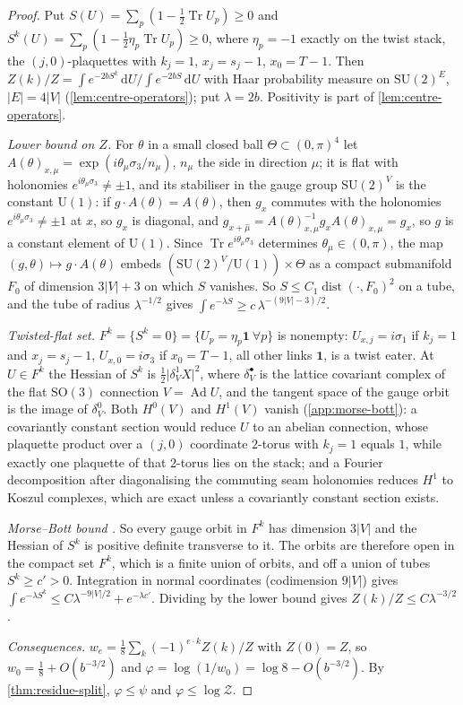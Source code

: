 \documentclass[11pt,a4paper]{amsart}
\theoremstyle{definition}
\theoremstyle{remark}
\numberwithin{equation}{section}
\DeclareMathOperator{\Tr}{Tr}        %
\newcommand{\abs}[1]{\lvert #1\rvert}      %
\newcommand{\dd}{\,\mathrm{d}}             %
\newcommand{\SU}{\mathrm{SU}}              %
\newcommand{\U}{\mathrm{U}}                %
\newcommand{\TT}{\mathbb{T}}               %
\newcommand{\Zc}{\mathcal{Z}}              %
\begin{document}
\begin{proof}
Put $S(U)=\sum_p(1-\frac12\Tr U_p)\ge0$ and $S^k(U)=\sum_p(1-\frac12\eta_p\Tr U_p)\ge0$, where $\eta_p=-1$ exactly on the twist stack, the $(j,0)$-plaquettes with $k_j=1$, $x_j=s_j-1$, $x_0=T-1$. Then $Z(k)/Z=\int e^{-2bS^k}\dd U/\int e^{-2bS}\dd U$ with Haar probability measure on $\SU(2)^E$, $\abs E=4\abs V$ \textup{(}\cref{lem:centre-operators}\textup{)}; put $\lambda=2b$. Positivity is part of \cref{lem:centre-operators}.

\emph{Lower bound on $Z$.} For $\theta$ in a small closed ball $\Theta\subset(0,\pi)^4$ let $A(\theta)_{x,\mu}=\exp(i\theta_\mu\sigma_3/n_\mu)$, $n_\mu$ the side in direction $\mu$; it is flat with holonomies $e^{i\theta_\mu\sigma_3}\ne\pm1$, and its stabiliser in the gauge group $\SU(2)^V$ is the constant $\U(1)$: if $g\cdot A(\theta)=A(\theta)$, then $g_x$ commutes with the holonomies $e^{i\theta_\mu\sigma_3}\ne\pm1$ at $x$, so $g_x$ is diagonal, and $g_{x+\hat\mu}=A(\theta)_{x,\mu}^{-1}g_xA(\theta)_{x,\mu}=g_x$, so $g$ is a constant element of $\U(1)$. Since $\Tr e^{i\theta_\mu\sigma_3}$ determines $\theta_\mu\in(0,\pi)$, the map $(g,\theta)\mapsto g\cdot A(\theta)$ embeds $(\SU(2)^V/\U(1))\times\Theta$ as a compact submanifold $F_0$ of dimension $3\abs V+3$ on which $S$ vanishes. So $S\le C_1\operatorname{dist}(\cdot,F_0)^2$ on a tube, and the tube of radius $\lambda^{-1/2}$ gives $\int e^{-\lambda S}\ge c\,\lambda^{-(9\abs V-3)/2}$.

\emph{Twisted-flat set.} $F^k=\{S^k=0\}=\{U_p=\eta_p\mathbf1\ \forall p\}$ is nonempty: $U_{x,j}=i\sigma_1$ if $k_j=1$ and $x_j=s_j-1$, $U_{x,0}=i\sigma_3$ if $x_0=T-1$, all other links $\mathbf1$, is a twist eater. At $U\in F^k$ the Hessian of $S^k$ is $\frac12\abs{\delta^1_VX}^2$, where $\delta^\bullet_V$ is the lattice covariant complex of the flat $\mathrm{SO}(3)$ connection $V=\operatorname{Ad}U$, and the tangent space of the gauge orbit is the image of $\delta^0_V$. Both $H^0(V)$ and $H^1(V)$ vanish (\cref{app:morse-bott}): a covariantly constant section would reduce $U$ to an abelian connection, whose plaquette product over a $(j,0)$ coordinate $2$-torus with $k_j=1$ equals $1$, while exactly one plaquette of that $2$-torus lies on the stack; and a Fourier decomposition after diagonalising the commuting seam holonomies reduces $H^1$ to Koszul complexes, which are exact unless a covariantly constant section exists.

\emph{Morse--Bott bound \cite{bott1954}.} So every gauge orbit in $F^k$ has dimension $3\abs V$ and the Hessian of $S^k$ is positive definite transverse to it. The orbits are therefore open in the compact set $F^k$, which is a finite union of orbits, and off a union of tubes $S^k\ge c'>0$. Integration in normal coordinates (codimension $9\abs V$) gives $\int e^{-\lambda S^k}\le C\lambda^{-9\abs V/2}+e^{-\lambda c'}$. Dividing by the lower bound gives $Z(k)/Z\le C\lambda^{-3/2}$.

\emph{Consequences.} $w_e=\frac18\sum_k(-1)^{e\cdot k}Z(k)/Z$ with $Z(0)=Z$, so $w_0=\frac18+O(b^{-3/2})$ and $\varphi=\log(1/w_0)=\log8-O(b^{-3/2})$. By \cref{thm:residue-split}, $\varphi\le\psi$ and $\varphi\le\log\Zc$.
\end{proof}
\end{document}
